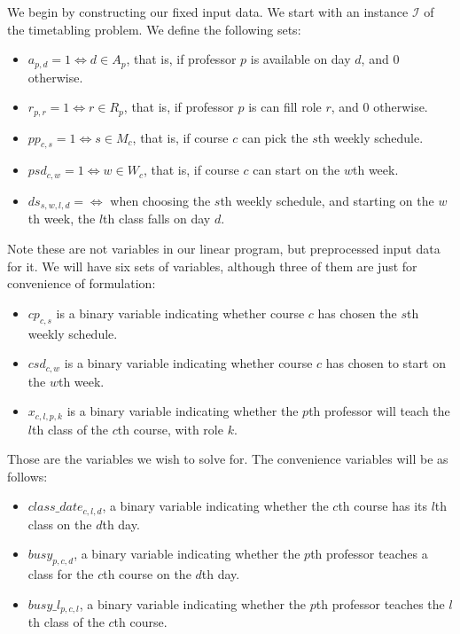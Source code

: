 We begin by constructing our fixed input data. We start with an instance $\mathcal{I}$ of the timetabling problem. We define the following sets:

\begin{itemize}
\item $a_{p, d} = 1 \iff d \in A_p$, that is, if professor $p$ is available on day $d$, and $0$ otherwise.
\item $r_{p, r} = 1 \iff r \in R_p$, that is, if professor $p$ is can fill role $r$, and $0$ otherwise.
\item $pp_{c, s} = 1 \iff s \in M_c$, that is, if course $c$ can pick the $s$th weekly schedule.
\item $psd_{c, w} = 1 \iff w \in W_c$, that is, if course $c$ can start on the $w$th week.
\item $ds_{s, w, l, d} = \iff $ when choosing the $s$th weekly schedule, and starting on the $w$th week, the $l$th class falls on day $d$.
\end{itemize}

Note these are not variables in our linear program, but preprocessed input data for it. We will have six sets of variables, although three of them are just for convenience of formulation:

\begin{itemize}
\item $cp_{c, s}$ is a binary variable indicating whether course $c$ has chosen the $s$th weekly schedule.
\item $csd_{c, w}$ is a binary variable indicating whether course $c$ has chosen to start on the $w$th week.
\item $x_{c, l, p, k}$ is a binary variable indicating whether the $p$th professor will teach the $l$th class of the $c$th course, with role $k$.
\end{itemize}

Those are the variables we wish to solve for. The convenience variables will be as follows:

\begin{itemize}
\item $class\_date_{c, l, d}$, a binary variable indicating whether the $c$th course has its $l$th class on the $d$th day.
\item $busy_{p, c, d}$, a binary variable indicating whether the $p$th professor teaches a class for the $c$th course on the $d$th day.
\item $busy\_l_{p, c, l}$, a binary variable indicating whether the $p$th professor teaches the $l$th class of the $c$th course.
\end{itemize}

